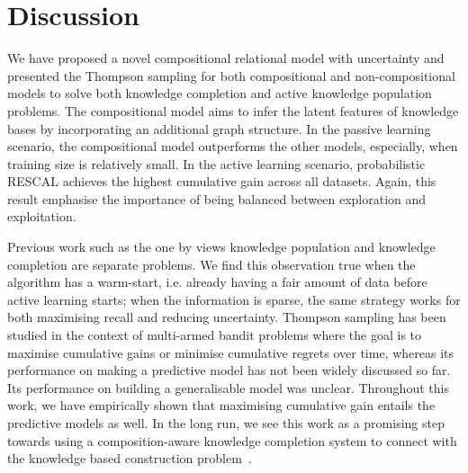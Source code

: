\section{Discussion}
We have proposed a novel compositional relational model with uncertainty and presented the
Thompson sampling for both compositional and non-compositional models to solve both knowledge completion and active knowledge population problems.
The compositional model aims to infer the latent features of knowledge 
bases by incorporating an additional graph structure. In the passive 
learning scenario, the compositional model outperforms the other models, 
especially, when training size is relatively small. 
In the active learning scenario, probabilistic RESCAL achieves the highest 
cumulative gain across all datasets. Again, this result emphasise the 
importance of being balanced between exploration and exploitation. 

Previous work such as the one by \cite{kajino2015active} 
views knowledge population 
and knowledge completion are separate problems. 
We find this observation true when the algorithm has a warm-start, 
i.e. already having a fair amount of data before active learning starts; 
when the information is sparse, the same strategy works for both maximising 
recall and reducing uncertainty.  
Thompson sampling has been studied in the context of multi-armed bandit 
problems where the goal is to maximise cumulative gains or minimise cumulative 
regrets over time, whereas its performance on making a predictive model has not 
been widely discussed so far. Its performance on building a generalisable model 
was unclear. Throughout this work, we have empirically shown that maximising 
cumulative gain entails the predictive models as well.
In the long run, we see this work as a promising step towards using a composition-aware knowledge 
completion system to connect with the 
knowledge based construction problem~\cite{dong2014knowledge}. %
